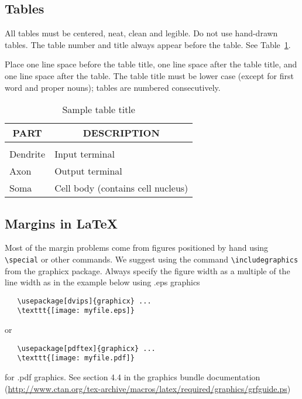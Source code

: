 \documentclass{article} %
\begin{document}
\subsection{Tables}

All tables must be centered, neat, clean and legible. Do not use hand-drawn
tables. The table number and title always appear before the table. See
Table~\ref{sample-table}.

Place one line space before the table title, one line space after the table
title, and one line space after the table. The table title must be lower case
(except for first word and proper nouns); tables are numbered consecutively.

\begin{table}[t]
\caption{Sample table title}
\label{sample-table}
\begin{center}
\begin{tabular}{ll}
\multicolumn{1}{c}{\bf PART}  &\multicolumn{1}{c}{\bf DESCRIPTION}
\\ \hline \\
Dendrite         &Input terminal \\
Axon             &Output terminal \\
Soma             &Cell body (contains cell nucleus) \\
\end{tabular}
\end{center}
\end{table}





\subsection{Margins in LaTeX}
 
Most of the margin problems come from figures positioned by hand using
\verb+\special+ or other commands. We suggest using the command
\verb+\includegraphics+
from the graphicx package. Always specify the figure width as a multiple of
the line width as in the example below using .eps graphics
\begin{verbatim}
   \usepackage[dvips]{graphicx} ... 
   \texttt{[image: myfile.eps]} 
\end{verbatim}
or %
\begin{verbatim}
   \usepackage[pdftex]{graphicx} ... 
   \texttt{[image: myfile.pdf]} 
\end{verbatim}
for .pdf graphics. 
See section 4.4 in the graphics bundle documentation (\url{http://www.ctan.org/tex-archive/macros/latex/required/graphics/grfguide.ps}) 
 
\end{document}
